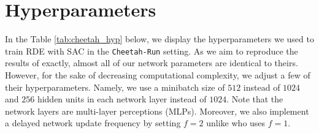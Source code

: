 \documentclass[base]{subfiles}
\begin{document}
\section{Hyperparameters}\label{app:b}

In the Table \ref{tab:cheetah_hyp} below, we display the hyperparameters we used to train RDE with SAC in the \texttt{Cheetah-Run} setting.
As we aim to reproduce the results of \cite{kim2023} exactly, almost all of our network parameters are identical to theirs.
However, for the sake of decreasing computational complexity, we adjust a few of their hyperparameters.
Namely, we use a minibatch size of $512$ instead of $1024$ and $256$ hidden units in each network layer instead of $1024$.
Note that the network layers are multi-layer perceptions (MLPs).
Moreover, we also implement a delayed network update frequency by setting $f=2$ unlike \cite{kim2023} who uses $f=1$.
\end{document}

